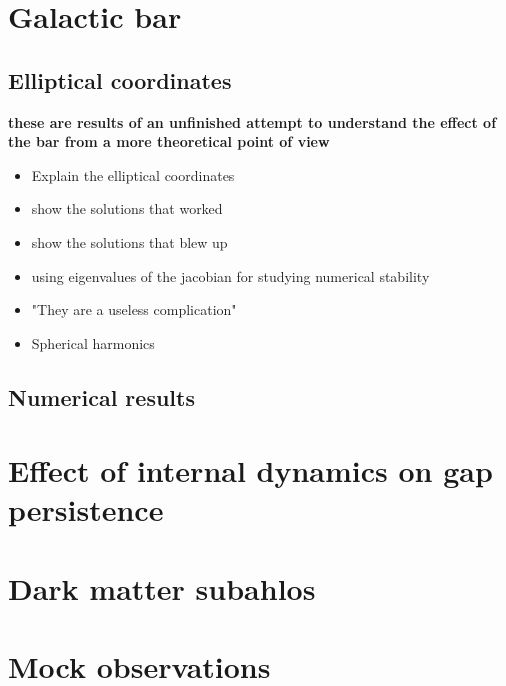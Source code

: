 \section{Galactic bar}
    \subsection{Elliptical coordinates}
        \textbf{these are results of an unfinished attempt to understand the effect of the bar from a more theoretical point of view}
        \begin{itemize}
            \item Explain the elliptical coordinates 
            \item show the solutions that worked
            \item show the solutions that blew up 
            \item using eigenvalues of the jacobian for studying numerical stability 
            \item "They are a useless complication"
            \item Spherical harmonics 
        \end{itemize}

    \subsection{Numerical results}







\section{Effect of internal dynamics on gap persistence }


\section{Dark matter subahlos}


\section{Mock observations}
